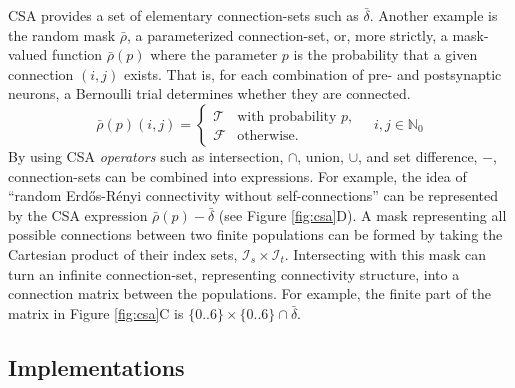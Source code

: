 \documentclass{frontiersSCNS} %
\begin{document}
CSA provides a set of elementary connection-sets such as
$\bar{\delta}$. Another example is the random mask $\bar{\rho}$, a
parameterized connection-set, or, more strictly, a mask-valued
function $\bar{\rho}(p)$ where the parameter $p$ is the probability
that a given connection $(i, j)$ exists.  That is, for each
combination of pre- and postsynaptic neurons, a Bernoulli trial
determines whether they are connected.
\begin{equation}
  \bar{\rho} (p) (i, j) =
  \begin{cases}
    \mathcal{T}& \text{with probability $p$},\\
    \mathcal{F}& \text{otherwise}.
  \end{cases}
  \quad i, j \in \mathbb{N}_0
\end{equation}
By using CSA \emph{operators} such as intersection, $\cap$, union,
$\cup$, and set difference, $-$, connection-sets can be combined into
expressions. For example, the idea of ``random Erd\H{o}s-R\'enyi
connectivity without self-connections'' can be represented by the CSA
expression $\bar{\rho}(p) - \bar{\delta}$ (see Figure
\ref{fig:csa}D). A mask representing all possible connections between
two finite populations can be formed by taking the Cartesian product
of their index sets, $\mathcal{I}_s \times
\mathcal{I}_t$. Intersecting with this mask can turn an infinite
connection-set, representing connectivity structure, into a connection
matrix between the populations. For example, the finite part of the
matrix in Figure \ref{fig:csa}C is $\{0..6\} \times \{0..6\} \cap
\bar{\delta}$.

\subsection{Implementations}\label{sec:impl}
\end{document}
